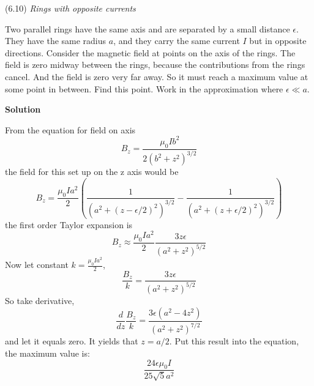 \documentclass{article}
\begin{document}
\maketitle
\newpage





\begin{homeworkProblem}
	(6.10) \textit{Rings with opposite currents}

	Two parallel rings have the same axis and are separated by a small distance $\epsilon$. They have the same radius $a$, and they carry the same current $I$ but in opposite directions. Consider the magnetic field at points on the axis of the rings. The field is zero midway between the rings, because the contributions from the rings cancel. And the field is zero very far away. So it must reach a maximum value at some point in between. Find this point. Work in the approximation where $\epsilon\ll a$.

	\textbf{Solution}

	From the equation for field on axis
	\begin{equation}\tag{6.53}
		B_z=\frac{\mu_0Ib^2}{2(b^2+z^2)^{3/2}}
	\end{equation}
	the field for this set up on the z axis would be
	\[
		B_z=\frac{\mu_0Ia^2}{2}\left(\frac{1}{(a^2+(z-\epsilon/2)^2)^{3/2}}-\frac{1}{(a^2+(z+\epsilon/2)^2)^{3/2}}\right)
	\]
	the first order Taylor expansion is
	\[
		B_z\approx\frac{\mu_0Ia^2}{2}\frac{3z\epsilon}{\left(a^2+z^2\right)^{5/2}}
	\]
	Now let constant $k=\frac{\mu_0Ia^2}{2}$,
	\[
		\frac{B_z}{k}=\frac{3z\epsilon}{\left(a^2+z^2\right)^{5/2}}
	\]
	So take derivative,
	\[
		\frac{d}{dz}\frac{B_z}{k}=\frac{3\epsilon\left(a^2-4z^2\right)}{\left(a^2+z^2\right)^{7/2}}
	\]
	and let it equals zero. It yields that $z=a/2$. Put this result into the equation, the maximum value is:
	\[
		\frac{24\epsilon\mu_0I}{25\sqrt{5}a^2}
	\]
\end{homeworkProblem}
\end{document}
